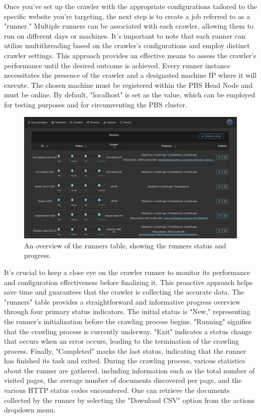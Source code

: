 Once you've set up the crawler with the appropriate configurations tailored to the specific website you're targeting, the next step is to create a job referred to as a "runner." Multiple runners can be associated with each crawler, allowing them to run on different days or machines. It's important to note that each runner can utilize multithreading based on the crawler's configurations and employ distinct crawler settings. This approach provides an effective means to assess the crawler's performance until the desired outcome is achieved. Every runner instance necessitates the presence of the crawler and a designated machine IP where it will execute. The chosen machine must be registered within the PBS Head Node and must be online. By default, "localhost" is set as the value, which can be employed for testing purposes and for circumventing the PBS cluster.

\begin{figure}[h]	
     \centering
     \includegraphics[width=13cm]{images/demo-8.png}
     \caption{An overview of the runners table, showing the runners status and progress.}
     \label{fig:software-arch}
\end{figure}


It's crucial to keep a close eye on the crawler runner to monitor its performance and configuration effectiveness before finalizing it. This proactive approach helps save time and guarantees that the crawler is collecting the accurate data. The "runners" table provides a straightforward and informative progress overview through four primary status indicators. The initial status is "New," representing the runner's initialization before the crawling process begins. "Running" signifies that the crawling process is currently underway. "Exit" indicates a status change that occurs when an error occurs, leading to the termination of the crawling process. Finally, "Completed" marks the last status, indicating that the runner has finished its task and exited. During the crawling process, various statistics about the runner are gathered, including information such as the total number of visited pages, the average number of documents discovered per page, and the various HTTP status codes encountered. One can retrieve the documents collected by the runner by selecting the "Download CSV" option from the actions dropdown menu.



